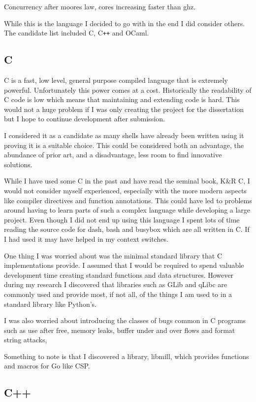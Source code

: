 Concurrency after moores law, cores increasing faster than ghz.

While this is the language I decided to go with in the end I did consider others.
The candidate list included C, C\verb!++! and OCaml.

\subsection{C}
C is a fast, low level, general purpose compiled language that is extremely powerful.
Unfortunately this power comes at a cost.
Historically the readability of C code is low which means that maintaining and extending code is hard.
This would not a huge problem if I was only creating the project for the dissertation but I hope to continue development after submission.

I considered it as a candidate as many shells have already been written using it proving it is a suitable choice.
This could be considered both an advantage, the abundance of prior art, and a disadvantage, less room to find innovative solutions.

While I have used some C in the past and have read the seminal book, K\&R C, I would not consider myself experienced, especially with the more modern aspects like compiler directives and function annotations.
This could have led to problems around having to learn parts of such a complex language while developing a large project.
Even though I did not end up using this language I spent lots of time reading the source code for dash, bash and busybox which are all written in C.
If I had used it may have helped in my context switches. 

One thing I was worried about was the minimal standard library that C implementations provide.
I assumed that I would be required to spend valuable development time creating standard functions and data structures.
However during my research I discovered that libraries such as GLib and qLibc are commonly used and provide most, if not all, of the things I am used to in a standard library like Python's.

I was also worried about introducing the classes of bugs common in C programs such as use after free, memory leaks, buffer under and over flows and format string attacks,

Something to note is that I discovered a library, libmill\cite{LIBMILL}, which provides functions and macros for Go like CSP.

\subsection{C++}

